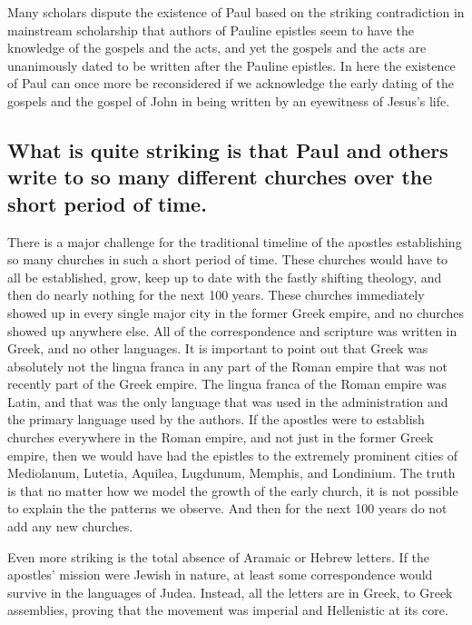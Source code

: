 Many scholars dispute the existence of Paul based on the striking contradiction in mainstream scholarship that authors of Pauline epistles seem to have the knowledge of the gospels and the acts, and yet the gospels and the acts are unanimously dated to be written after the Pauline epistles.
In here the existence of Paul can once more be reconsidered if we acknowledge the early dating of the gospels and the gospel of John in being written by an eyewitness of Jesus's life.

\subsection{What is quite striking is that Paul and others write to so many different churches over the short period of time.}\label{subsec:what-is-quite-striking-is-that-paul-and-others-write-to-so-many-different-churches-over-the-short-period-of-time.}

There is a major challenge for the traditional timeline of the apostles establishing so many churches in such a short period of time.
These churches would have to all be established, grow, keep up to date with the fastly shifting theology, and then do nearly nothing for the next 100 years.
These churches immediately showed up in every single major city in the former Greek empire, and no churches showed up anywhere else.
All of the correspondence and scripture was written in Greek, and no other languages.
It is important to point out that Greek was absolutely not the lingua franca in any part of the Roman empire that was not recently part of the Greek empire.
The lingua franca of the Roman empire was Latin, and that was the only language that was used in the administration and the primary language used by the authors.
If the apostles were to establish churches everywhere in the Roman empire, and not just in the former Greek empire, then we would have had the epistles to the extremely prominent cities of Mediolanum, Lutetia, Aquilea, Lugdunum, Memphis, and Londinium.
The truth is that no matter how we model the growth of the early church, it is not possible to explain the the patterns we observe.
And then for the next 100 years do not add any new churches.

Even more striking is the total absence of Aramaic or Hebrew letters.
If the apostles’ mission were Jewish in nature, at least some correspondence would survive in the languages of Judea.
Instead, all the letters are in Greek, to Greek assemblies, proving that the movement was imperial and Hellenistic at its core.

